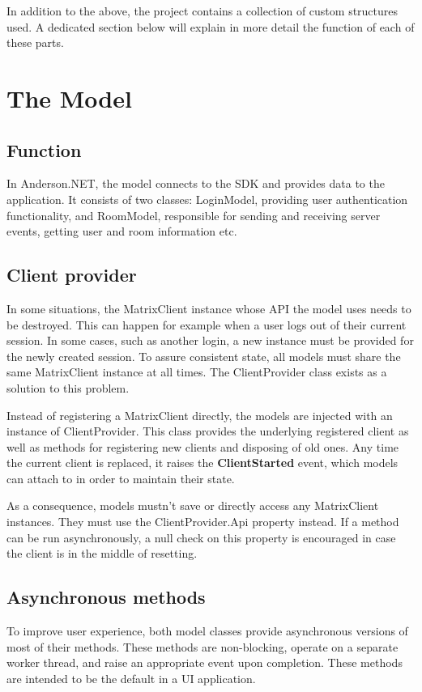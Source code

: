 \documentclass[titlepage]{scrartcl}
\begin{document}
In addition to the above, the project contains a collection of custom structures used. A dedicated section below will explain in more detail the function of each of these parts. 

\section{The Model}
\subsection{Function}
In Anderson.NET, the model connects to the SDK and provides data to the application. It consists of two classes: LoginModel, providing user authentication functionality, and RoomModel, responsible for sending and receiving server events, getting user and room information etc.

\subsection{Client provider}
In some situations, the MatrixClient instance whose API the model uses needs to be destroyed. This can happen for example when a user logs out of their current session. In some cases, such as another login, a new instance must be provided for the newly created session. To assure consistent state, all models must share the same MatrixClient instance at all times. The ClientProvider class exists as a solution to this problem.

Instead of registering a MatrixClient directly, the models are injected with an instance of ClientProvider. This class provides the underlying registered client as well as methods for registering new clients and disposing of old ones. Any time the current client is replaced, it raises the \textbf{ClientStarted} event, which models can attach to in order to maintain their state.

As a consequence, models mustn't save or directly access any MatrixClient instances. They must use the ClientProvider.Api property instead. If a method can be run asynchronously, a null check on this property is encouraged in case the client is in the middle of resetting.

\subsection{Asynchronous methods}
To improve user experience, both model classes provide asynchronous versions of most of their methods. These methods are non-blocking, operate on a separate worker thread, and raise an appropriate event upon completion. These methods are intended to be the default in a UI application.
\end{document}
